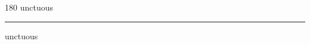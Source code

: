 
\begin{frame}
\begin{center}
\begin{turn}{180}
{\fontsize{2.5cm}{1em}\selectfont unctuous}
\end{turn}
\vspace{1em}\par  
\hrule
\vspace{1em}\par  
{\fontsize{2.5cm}{1em}\selectfont unctuous}
\end{center}
\end{frame}
